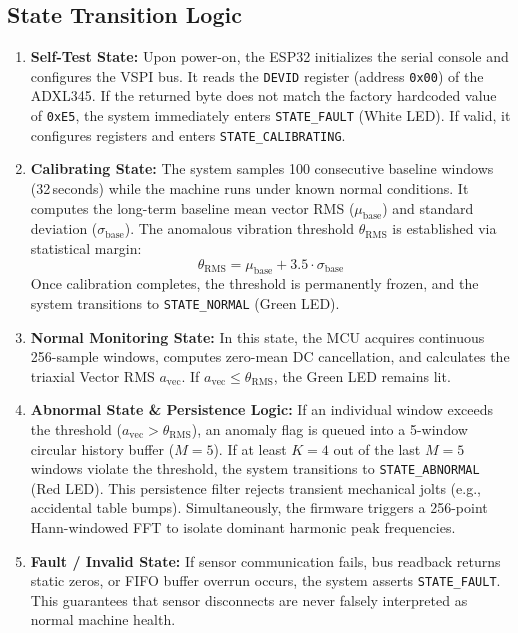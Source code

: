\subsection{State Transition Logic}
\begin{enumerate}
    \item \textbf{Self-Test State:} Upon power-on, the ESP32 initializes the serial console and configures the VSPI bus. It reads the \texttt{DEVID} register (address \texttt{0x00}) of the ADXL345. If the returned byte does not match the factory hardcoded value of \texttt{0xE5}, the system immediately enters \texttt{STATE\_FAULT} (White LED). If valid, it configures registers and enters \texttt{STATE\_CALIBRATING}.
    \item \textbf{Calibrating State:} The system samples 100 consecutive baseline windows (32\,seconds) while the machine runs under known normal conditions. It computes the long-term baseline mean vector RMS ($\mu_{\mathrm{base}}$) and standard deviation ($\sigma_{\mathrm{base}}$). The anomalous vibration threshold $\theta_{\mathrm{RMS}}$ is established via statistical margin:
    \begin{equation}
    \theta_{\mathrm{RMS}} = \mu_{\mathrm{base}} + 3.5 \cdot \sigma_{\mathrm{base}}
    \label{eq:threshold}
    \end{equation}
    Once calibration completes, the threshold is permanently frozen, and the system transitions to \texttt{STATE\_NORMAL} (Green LED).
    \item \textbf{Normal Monitoring State:} In this state, the MCU acquires continuous 256-sample windows, computes zero-mean DC cancellation, and calculates the triaxial Vector RMS $a_{\mathrm{vec}}$. If $a_{\mathrm{vec}} \le \theta_{\mathrm{RMS}}$, the Green LED remains lit.
    \item \textbf{Abnormal State \& Persistence Logic:} If an individual window exceeds the threshold ($a_{\mathrm{vec}} > \theta_{\mathrm{RMS}}$), an anomaly flag is queued into a 5-window circular history buffer ($M = 5$). If at least $K = 4$ out of the last $M = 5$ windows violate the threshold, the system transitions to \texttt{STATE\_ABNORMAL} (Red LED). This persistence filter rejects transient mechanical jolts (e.g., accidental table bumps). Simultaneously, the firmware triggers a 256-point Hann-windowed FFT to isolate dominant harmonic peak frequencies.
    \item \textbf{Fault / Invalid State:} If sensor communication fails, bus readback returns static zeros, or FIFO buffer overrun occurs, the system asserts \texttt{STATE\_FAULT}. This guarantees that sensor disconnects are never falsely interpreted as normal machine health.
\end{enumerate}

